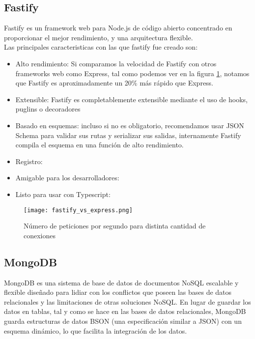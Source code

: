 \subsection{Fastify}

Fastify es un framework web para Node.js de código abierto concentrado en proporcionar el mejor rendimiento, y una arquitectura flexible. \\

Las principales caracteristicas con las que fastify fue creado son:

\begin{itemize}

    \item Alto rendimiento: Si comparamos la velocidad de Fastify con otros frameworks web como Express, tal como podemos ver en la figura \ref{fig:fastify_vs_express}, notamos que Fastify es aproximadamente un 20\% más rápido que Express.
    \item Extensible: Fastify es completablemente extensible mediante el uso de hooks, puglins o decoradores
    \item Basado en esquemas: incluso si no es obligatorio, recomendamos usar JSON Schema para validar sus rutas y serializar sus salidas, internamente Fastify compila el esquema en una función de alto rendimiento.
    \item Registro: 
    \item Amigable para los desarrolladores:
    \item Listo para usar con Typescript:
  
\end{itemize}


\begin{figure}[H]
    \texttt{[image: fastify\_vs\_express.png]}
    \caption{ Número de peticiones por segundo para distinta cantidad de conexiones}
    \label{fig:fastify_vs_express}
\end{figure}

\subsection{MongoDB}

MongoDB es una sistema de base de datos de documentos NoSQL escalable y flexible diseñado para lidiar con los conflictos que poseen las bases de datos relacionales y las limitaciones de otras soluciones NoSQL. En lugar de guardar los datos en tablas, tal y como se hace en las bases de datos relacionales, MongoDB guarda estructuras de datos BSON (una especificación similar a JSON) con un esquema dinámico, lo que facilita la integración de los datos.

